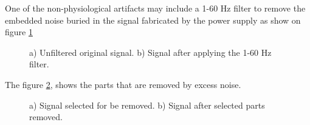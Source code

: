 \documentclass[letterpaper,12pt,openright,oneside]{article}
\begin{document}




One of the non-physiological artifacts may include a 1-60 Hz filter to remove the embedded noise buried in the signal fabricated by the power supply as show on figure \ref{fig 82}

\begin{figure}[H]
\centerline{}
\caption{a) Unfiltered original signal. b) Signal after applying the 1-60 Hz filter.}
\label{fig 82}
\end{figure}


The figure \ref{fig 83}, shows the parts that are removed by excess noise. \\

\begin{figure}[H]
\centerline{}
\caption{a) Signal selected for be removed. b) Signal after selected parts removed.}
\label{fig 83}
\end{figure}
\end{document}
